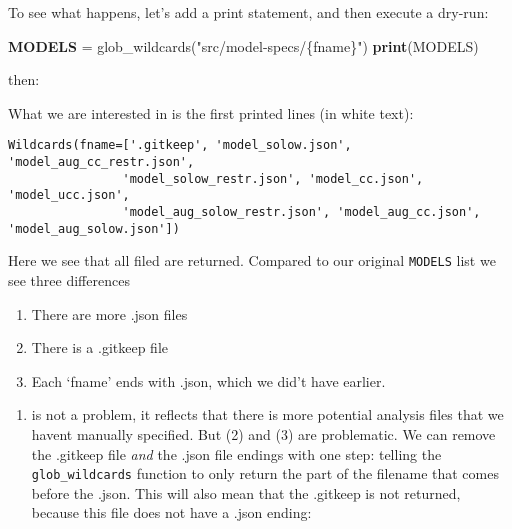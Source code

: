 \documentclass[]{book}
\newenvironment{Shaded}{\begin{snugshade}}{\end{snugshade}}
\newcommand{\KeywordTok}[1]{\textcolor[rgb]{0.13,0.29,0.53}{\textbf{{#1}}}}
\newcommand{\StringTok}[1]{\textcolor[rgb]{0.31,0.60,0.02}{{#1}}}
\newcommand{\NormalTok}[1]{{#1}}
\providecommand{\tightlist}{%
  \setlength{\itemsep}{0pt}\setlength{\parskip}{0pt}}
\theoremstyle{definition}
\theoremstyle{definition}
\theoremstyle{definition}
\theoremstyle{remark}
\begin{document}
To see what happens, let's add a print statement, and then execute a
dry-run:

\begin{Shaded}
\begin{Highlighting}[]
\KeywordTok{MODELS} \NormalTok{= glob_wildcards(}\StringTok{"src/model-specs/\{fname\}"}\NormalTok{)}
\KeywordTok{print}\NormalTok{(MODELS)}
\end{Highlighting}
\end{Shaded}

then:

\begin{Shaded}
\end{Shaded}

What we are interested in is the first printed lines (in white text):

\begin{verbatim}
Wildcards(fname=['.gitkeep', 'model_solow.json', 'model_aug_cc_restr.json',
                'model_solow_restr.json', 'model_cc.json', 'model_ucc.json',
                'model_aug_solow_restr.json', 'model_aug_cc.json', 'model_aug_solow.json'])
\end{verbatim}

Here we see that all filed are returned. Compared to our original
\texttt{MODELS} list we see three differences

\begin{enumerate}
\def\labelenumi{\arabic{enumi}.}
\tightlist
\item
  There are more .json files
\item
  There is a .gitkeep file
\item
  Each `fname' ends with .json, which we did't have earlier.
\end{enumerate}

\begin{enumerate}
\def\labelenumi{(\arabic{enumi})}
\tightlist
\item
  is not a problem, it reflects that there is more potential analysis
  files that we havent manually specified. But (2) and (3) are
  problematic. We can remove the .gitkeep file \emph{and} the .json file
  endings with one step: telling the \texttt{glob\_wildcards} function
  to only return the part of the filename that comes before the .json.
  This will also mean that the .gitkeep is not returned, because this
  file does not have a .json ending:
\end{enumerate}
\end{document}
